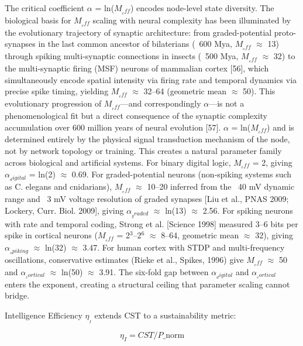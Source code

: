 \documentclass[a4paper,12pt]{article}
\begin{document}
The critical coefficient $\alpha$ = ln($M_{_eff}$) encodes node-level state diversity. The biological basis for $M_{_eff}$ scaling with neural complexity has been illuminated by the evolutionary trajectory of synaptic architecture: from graded-potential proto-synapses in the last common ancestor of bilaterians (~600 Mya, $M_{_eff}$ $\approx$ 13) through spiking multi-synaptic connections in insects (~500 Mya, $M_{_eff}$ $\approx$ 32) to the multi-synaptic firing (MSF) neurons of mammalian cortex [56], which simultaneously encode spatial intensity via firing rate and temporal dynamics via precise spike timing, yielding $M_{_eff}$ $\approx$ 32--64 (geometric mean $\approx$ 50). This evolutionary progression of $M_{_eff}$---and correspondingly $\alpha$---is not a phenomenological fit but a direct consequence of the synaptic complexity accumulation over 600 million years of neural evolution [57]. $\alpha$ = ln($M_{_eff}$) and is determined entirely by the physical signal transduction mechanism of the node, not by network topology or training. This creates a natural parameter family across biological and artificial systems. For binary digital logic, $M_{_eff}$ = 2, giving $\alpha_{_digital}$ = ln(2) $\approx$ 0.69. For graded-potential neurons (non-spiking systems such as C. elegans and cnidarians), $M_{_eff}$ $\approx$ 10--20 inferred from the ~40 mV dynamic range and ~3 mV voltage resolution of graded synapses [Liu et al., PNAS 2009; Lockery, Curr. Biol. 2009], giving $\alpha_{_graded}$ $\approx$ ln(13) $\approx$ 2.56. For spiking neurons with rate and temporal coding, Strong et al. [Science 1998] measured 3--6 bits per spike in cortical neurons ($M_{_eff}$ = 2$^3$--2$^6$ $\approx$ 8--64, geometric mean $\approx$ 32), giving $\alpha_{_spiking}$ $\approx$ ln(32) $\approx$ 3.47. For human cortex with STDP and multi-frequency oscillations, conservative estimates (Rieke et al., Spikes, 1996) give $M_{_eff}$ $\approx$ 50 and $\alpha_{_cortical}$ $\approx$ ln(50) $\approx$ 3.91. The six-fold gap between $\alpha_{_digital}$ and $\alpha_{_cortical}$ enters the exponent, creating a structural ceiling that parameter scaling cannot bridge.


Intelligence Efficiency $\eta_{_I}$ extends CST to a sustainability metric:


\begin{equation}

\eta_I = CST / P\_{\text{norm}} \tag{5}

\end{equation}
\end{document}
